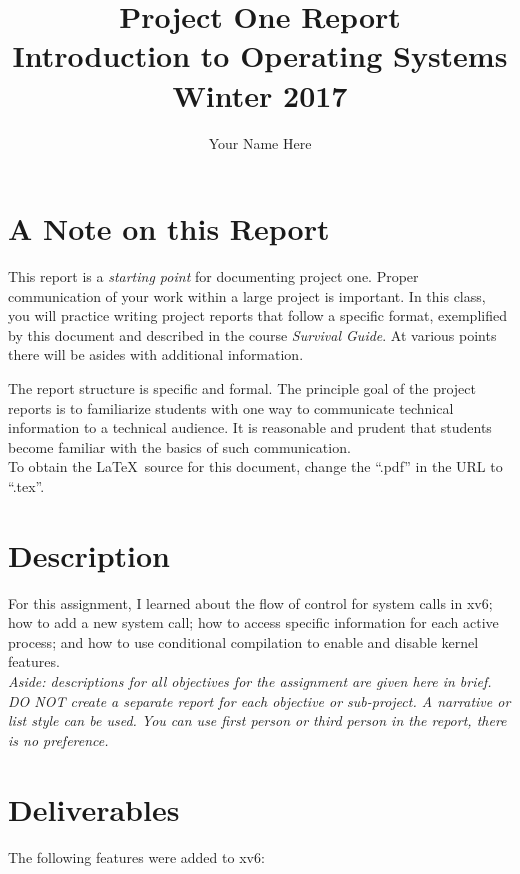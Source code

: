 \documentclass[11pt,letterpaper]{report}
\author{Your Name Here}
\title{Project One Report\\Introduction to Operating Systems\\ Winter 2017}
\date{}
\begin{document}
	
	\section*{A Note on this Report}
	This report is a \emph{starting point} for documenting project one. Proper communication of your work within a large project is important. In this class, you will practice writing project reports that follow a specific format, exemplified by this document and described  in the course \emph{Survival Guide}. At various points there will be asides with additional information.
	
	The report structure is specific and formal. The principle goal of the project reports is to familiarize students with one way to communicate technical information to a technical audience. It is reasonable and prudent that students become familiar with the basics of such communication. \\
	
	\noindent To obtain the \LaTeX\ source for this document, change the ``.pdf'' in the URL to ``.tex''.	

	\section*{Description}
	For this assignment, I learned about the flow of control for  system calls in xv6; how to add a new system call; how to access specific information for each active process; and how to use conditional compilation to enable and disable kernel features. \\
	
	\noindent \emph{Aside: descriptions for all objectives for the assignment are given here in brief. DO NOT create a separate report for each objective or sub-project. A narrative or list style can be used. You can use first person or third person in the report, there is no preference.}

	
	\section*{Deliverables}
	The following features were added to xv6:
	
\end{document}
